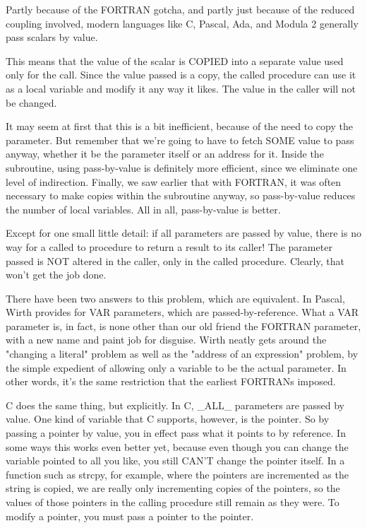 \documentclass[float=false, crop=false]{standalone}
\begin{document}
Partly because of the FORTRAN gotcha, and partly just because of the reduced
coupling involved, modern languages like C, Pascal, Ada, and Modula 2 generally
pass scalars by value.

This means that the value of the scalar is COPIED into a separate value used
only for the call. Since the value passed is a copy, the called procedure can
use it as a local variable and modify it any way it likes. The value in the
caller will not be changed.

It may seem at first that this is a bit inefficient, because of the need to copy
the parameter. But remember that we're going to have to fetch SOME value to pass
anyway, whether it be the parameter itself or an address for it. Inside the
subroutine, using pass-by-value is definitely more efficient, since we eliminate
one level of indirection. Finally, we saw earlier that with FORTRAN, it was
often necessary to make copies within the subroutine anyway, so pass-by-value
reduces the number of local variables. All in all, pass-by-value is better.

Except for one small little detail: if all parameters are passed by value, there
is no way for a called to procedure to return a result to its caller! The
parameter passed is NOT altered in the caller, only in the called procedure.
Clearly, that won't get the job done.

There have been two answers to this problem, which are equivalent. In Pascal,
Wirth provides for VAR parameters, which are passed-by-reference. What a VAR
parameter is, in fact, is none other than our old friend the FORTRAN parameter,
with a new name and paint job for disguise. Wirth neatly gets around the
"changing a literal" problem as well as the "address of an expression" problem,
by the simple expedient of allowing only a variable to be the actual parameter.
In other words, it's the same restriction that the earliest FORTRANs imposed.

C does the same thing, but explicitly. In C, _ALL_ parameters are passed by
value. One kind of variable that C supports, however, is the pointer. So by
passing a pointer by value, you in effect pass what it points to by reference.
In some ways this works even better yet, because even though you can change the
variable pointed to all you like, you still CAN'T change the pointer itself. In
a function such as strcpy, for example, where the pointers are incremented as
the string is copied, we are really only incrementing copies of the pointers, so
the values of those pointers in the calling procedure still remain as they were.
To modify a pointer, you must pass a pointer to the pointer.
\end{document}
